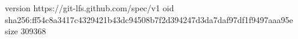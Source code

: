 version https://git-lfs.github.com/spec/v1
oid sha256:ff54c8a3417c4329421b43dc94508b7f2d394247d3da7daf97df1f9497aaa95e
size 309368
